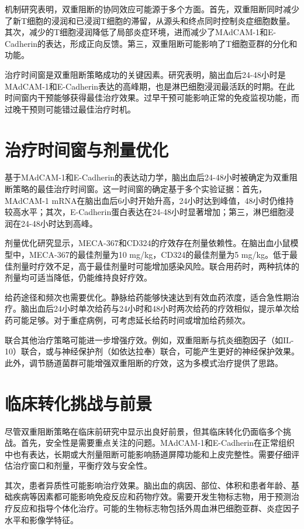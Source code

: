 \documentclass[12pt,a4paper]{article}
\begin{document}
机制研究表明，双重阻断的协同效应可能源于多个方面。首先，双重阻断同时减少了新T细胞的浸润和已浸润T细胞的滞留，从源头和终点同时控制炎症细胞数量。其次，减少的T细胞浸润降低了局部炎症环境，进而减少了MAdCAM-1和E-Cadherin的表达，形成正向反馈。第三，双重阻断可能影响了T细胞亚群的分化和功能。

治疗时间窗是双重阻断策略成功的关键因素。研究表明，脑出血后24-48小时是MAdCAM-1和E-Cadherin表达的高峰期，也是淋巴细胞浸润最活跃的时期。在此时间窗内干预能够获得最佳治疗效果。过早干预可能影响正常的免疫监视功能，而过晚干预则可能错过最佳治疗时机。

\section{治疗时间窗与剂量优化}
基于MAdCAM-1和E-Cadherin的表达动力学，脑出血后24-48小时被确定为双重阻断策略的最佳治疗时间窗。这一时间窗的确定基于多个实验证据：首先，MAdCAM-1 mRNA在脑出血后6小时开始升高，24小时达到峰值，48小时仍维持较高水平；其次，E-Cadherin蛋白表达在24-48小时显著增加；第三，淋巴细胞浸润在24-48小时达到高峰。

剂量优化研究显示，MECA-367和CD324的疗效存在剂量依赖性。在脑出血小鼠模型中，MECA-367的最佳剂量为10 mg/kg，CD324的最佳剂量为5 mg/kg。低于最佳剂量时疗效不足，高于最佳剂量时可能增加感染风险。联合用药时，两种抗体的剂量均可适当降低，仍能维持良好疗效。

给药途径和频次也需要优化。静脉给药能够快速达到有效血药浓度，适合急性期治疗。脑出血后24小时单次给药与24小时和48小时两次给药的疗效相似，提示单次给药可能足够。对于重症病例，可考虑延长给药时间或增加给药频次。

联合其他治疗策略可能进一步增强疗效。例如，双重阻断与抗炎细胞因子（如IL-10）联合，或与神经保护剂（如依达拉奉）联合，可能产生更好的神经保护效果。此外，调节肠道菌群可能增强双重阻断的疗效，这为多模式治疗提供了思路。

\section{临床转化挑战与前景}
尽管双重阻断策略在临床前研究中显示出良好前景，但其临床转化仍面临多个挑战。首先，安全性是需要重点关注的问题。MAdCAM-1和E-Cadherin在正常组织中也有表达，长期或大剂量阻断可能影响肠道屏障功能和上皮完整性。需要仔细评估治疗窗口和剂量，平衡疗效与安全性。

其次，患者异质性可能影响治疗效果。脑出血的病因、部位、体积和患者年龄、基础疾病等因素都可能影响免疫反应和药物疗效。需要开发生物标志物，用于预测治疗反应和指导个体化治疗。可能的生物标志物包括外周血淋巴细胞亚群、炎症因子水平和影像学特征。
\end{document}
